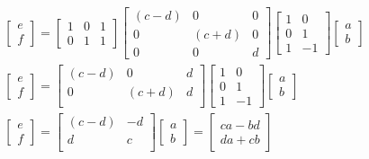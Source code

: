 \documentclass[11pt,a4paper,final]{article}
\begin{document}
\begin{equation*}
\begin{array}{c}
\begin{bmatrix} e \\ f \end{bmatrix} =
\begin{bmatrix} 1 & 0 & 1 \\ 0 & 1 & 1 \end{bmatrix}
\begin{bmatrix}
(c-d) & 0 & 0 \\
0 & (c+d) & 0 \\
0 & 0 & d
\end{bmatrix}
\begin{bmatrix}
1 & 0 \\
0 & 1 \\
1 & -1
\end{bmatrix}
\begin{bmatrix} a \\ b \end{bmatrix} \\
\begin{bmatrix} e \\ f \end{bmatrix} =
\begin{bmatrix}
(c-d) & 0 & d \\
0 & (c+d) & d \\
\end{bmatrix}
\begin{bmatrix}
1 & 0 \\
0 & 1 \\
1 & -1
\end{bmatrix}
\begin{bmatrix} a \\ b \end{bmatrix} \\
\begin{bmatrix} e \\ f \end{bmatrix} =
\begin{bmatrix}
(c-d) & -d \\
d & c \\
\end{bmatrix}
\begin{bmatrix} a \\ b \end{bmatrix} =
\begin{bmatrix}
ca - bd \\ da + cb
\end{bmatrix}
\end{array}
\end{equation*}
\end{document}
